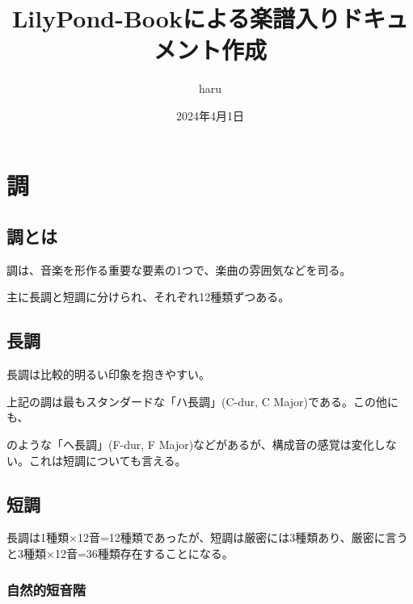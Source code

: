 \documentclass{ltjsarticle}
\begin{document}
\title{LilyPond-Bookによる楽譜入りドキュメント作成}
\author{haru}
\date{2024年4月1日}
\maketitle

\tableofcontents

\section{調}
\subsection{調とは}

調は、音楽を形作る重要な要素の1つで、楽曲の雰囲気などを司る。

主に長調と短調に分けられ、それぞれ12種類ずつある。  

\subsection{長調}

長調は比較的明るい印象を抱きやすい。

{%
\parindent 0pt
\noindent
\ifx\preLilyPondExample \undefined
\else
  \expandafter\preLilyPondExample
\fi
\def\lilypondbook{}%
%
\ifx\postLilyPondExample \undefined
\else
  \expandafter\postLilyPondExample
\fi
}

上記の調は最もスタンダードな「ハ長調」(C-dur, C Major)である。この他にも、

{%
\parindent 0pt
\noindent
\ifx\preLilyPondExample \undefined
\else
  \expandafter\preLilyPondExample
\fi
\def\lilypondbook{}%
%
\ifx\postLilyPondExample \undefined
\else
  \expandafter\postLilyPondExample
\fi
}

のような「ヘ長調」(F-dur, F Major)などがあるが、構成音の感覚は変化しない。これは短調についても言える。

\subsection{短調}

長調は1種類×12音=12種類であったが、短調は厳密には3種類あり、厳密に言うと3種類×12音=36種類存在することになる。  

\subsubsection{自然的短音階}
\end{document}
